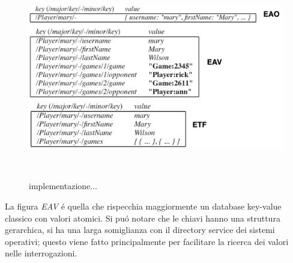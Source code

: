 \begin{figure}[H]
    \begin{center}
        \includegraphics[width=1\textwidth]{img/implementazione}
    \end{center}
\caption{implementazione...}\\
\end{figure}

La figura \emph{EAV} é quella che rispecchia maggiormente un database key-value classico con valori atomici.
Si puó notare che le chiavi hanno una struttura gerarchica, si ha una larga somiglianza con il directory service dei sistemi operativi;
questo viene fatto principalmente per facilitare la ricerca dei valori nelle interrogazioni.
